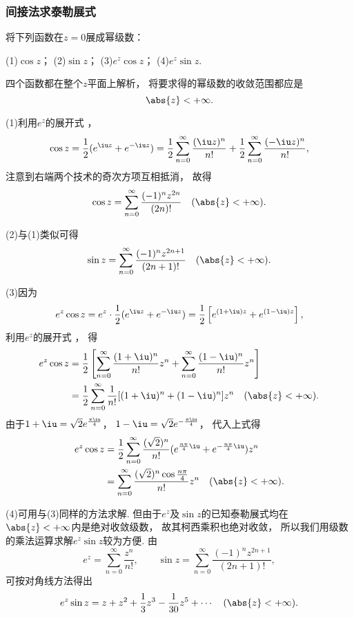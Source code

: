 \subsubsection{间接法求泰勒展式}
\begin{example}
将下列函数在\(z = 0\)展成幂级数：

(1)\(\cos z\)； \hfill (2)\(\sin z\)； \hfill (3)\(e^z \cos z\)； \hfill (4)\(e^z \sin z\).
\begin{solution}
四个函数都在整个\(z\)平面上解析，
将要求得的幂级数的收敛范围都应是\[
	\abs{z}<+\infty.
\]

(1)利用\(e^z\)的展开式 ，
\[
	\cos z = \frac12 (e^{\iu z} + e^{-\iu z})
	= \frac12 \sum_{n=0}^\infty \frac{(\iu z)^n}{n!} + \frac12 \sum_{n=0}^\infty \frac{(-\iu z)^n}{n!},
\]
注意到右端两个技术的奇次方项互相抵消，
故得\begin{equation}\label{equation:解析函数的级数表示.余弦函数的泰勒展式}
	\cos z = \sum_{n=0}^\infty \frac{(-1)^n z^{2n}}{(2n)!}
	\quad(\abs{z}<+\infty).
\end{equation}

(2)与(1)类似可得\begin{equation}\label{equation:解析函数的级数表示.正弦函数的泰勒展式}
	\sin z = \sum_{n=0}^\infty \frac{(-1)^n z^{2n+1}}{(2n+1)!}
	\quad(\abs{z}<+\infty).
\end{equation}

(3)因为\[
	e^z \cos z = e^z \cdot \frac12 (e^{\iu z} + e^{-\iu z})
	= \frac12 \left[e^{(1+\iu)z} + e^{(1-\iu)z}\right],
\]
利用\(e^z\)的展开式 ，
得\begin{align*}
	e^z \cos z
	&= \frac12 \left[
			\sum_{n=0}^\infty \frac{(1+\iu)^n}{n!} z^n
			+ \sum_{n=0}^\infty \frac{(1-\iu)^n}{n!} z^n
		\right] \\
	&= \frac12 \sum_{n=0}^\infty \frac1{n!} [(1+\iu)^n+(1-\iu)^n] z^n
	\quad(\abs{z}<+\infty).
\end{align*}
由于\(1+\iu=\sqrt{2} e^{\frac{\pi\iu}{4}}\)，
\(1-\iu=\sqrt{2} e^{-\frac{\pi\iu}{4}}\)，
代入上式得\begin{equation}
	\begin{split}
		e^z \cos z
		&= \frac12
			\sum_{n=0}^\infty
			\frac{(\sqrt{2})^n}{n!}
			(e^{\frac{n\pi}{4}\iu}+e^{-\frac{n\pi}{4}\iu}) z^n \\
		&= \sum_{n=0}^\infty \frac{(\sqrt{2})^n \cos\frac{n\pi}{4}}{n!} z^n
		\quad(\abs{z}<+\infty).
	\end{split}
\end{equation}

(4)可用与(3)同样的方法求解.
但由于\(e^z\)及\(\sin z\)的已知泰勒展式均在\(\abs{z}<+\infty\)内是绝对收敛级数，
故其柯西乘积也绝对收敛，
所以我们用级数的乘法运算求解\(e^z \sin z\)较为方便.
由\[
	e^z = \sum_{n=0}^\infty \frac{z^n}{n!},
	\qquad
	\sin z = \sum_{n=0}^\infty \frac{(-1)^n z^{2n+1}}{(2n+1)!},
\]
可按对角线方法得出\[
	e^z \sin z
	= z + z^2 + \frac13 z^3 - \frac1{30} z^5 + \dotsb
	\quad(\abs{z}<+\infty).
\]
\end{solution}
\end{example}

